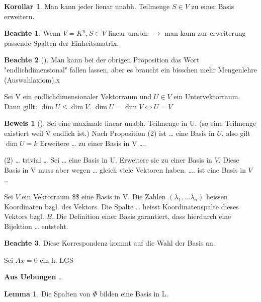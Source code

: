 \documentclass[oneside,fontsize=11pt,paper=a4,BCOR=0mm,DIV=12,automark,headsepline]{scrbook}
\theoremstyle{remark}
\theoremstyle{definition}
\newtheorem*{notte}{Beachte}
\newtheorem{lemma}{Lemma}[section]
\newtheorem*{korollar}{Korollar}
\theoremstyle{definition}
\newtheorem*{prof}{Beweis}
\theoremstyle{remark}
\begin{document}
\begin{korollar}
  Man kann jeder lienar unabh. Teilmenge \(S\in V\) zu einer Basis
  erweitern.
\end{korollar}

\begin{notte}
  Wenn \(V=K^n, S\in V\) linear unabh. \(\rightarrow\) man kann zur erweiterung passende
  Spalten der Einheitsmatrix.
\end{notte}

\begin{notte}[]
  Man kann bei der obrigen Proposition das Wort "endlichdimensional" fallen
  lassen, aber es braucht ein bisschen mehr Mengenlehre (Auswahlaxiom).x
\end{notte}
\begin{theo}{}{}
  Sei V ein endlichdimensionaler Vektorraum und \(U\in V\) ein Untervektorraum. Dann
  gillt: \(\dim U \leq \dim V\).  \(\dim U = \dim V \iff U=V\)
\end{theo}

\begin{prof}[]
  Sei eine maximale linear unabh. Teilmenge in U. (so eine Teilmenge existiert
  weil V endlich ist.)
  Nach Proposition (2) ist \ldots{} eine Basis in \(U\), also gilt \(\dim U = k\) Erweitere
  \ldots{} zu einer Basis in V \ldots{}. 

  (2) \ldots{} trivial \ldots{} Sei \ldots{} eine Basis in U. Erweitere sie zu einer Basis in
  \(V\). Diese Basis in V muss aber wegen \ldots{} gleich viele Vektoren haben. \ldots{}. ist
  eine Basis in \(V\) \ldots{}
\end{prof}


\begin{definition}{}{}
  Sei \(V\) ein Vektorraum \$\$ eine Basis in V. Die Zahlen \((\lambda_1,...\lambda_n)\)
  heissen Koordinaten bzgl. des Vektors. Die Spalte \ldots{} heisst Koordinatenspalte
  dieses Vektors bzgl. \(B\).
  Die Definition einer Basis garantiert, dass hierdurch eine Bijektion \ldots{} entsteht.
\end{definition}

\begin{notte}
  Diese Korrespondenz kommt auf die Wahl der Basis an.
\end{notte}

\begin{exa}
  Sei \(Ax=0\) ein h. LGS
\end{exa}

\textbf{Aus Uebungen} \ldots{}

\begin{lemma}
  Die Spalten von \(\Phi\) bilden eine Basis in L.
\end{lemma}
\end{document}
